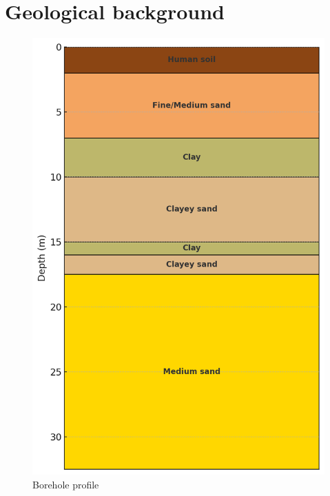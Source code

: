 \chapter{Geological background}

\begin{figure}[H]
    \centering
    \includegraphics[width=0.5\linewidth]{figures//ch9/Bodemprofiel.png}
    \caption{Borehole profile }
    \label{fig:placeholder}
\end{figure}

